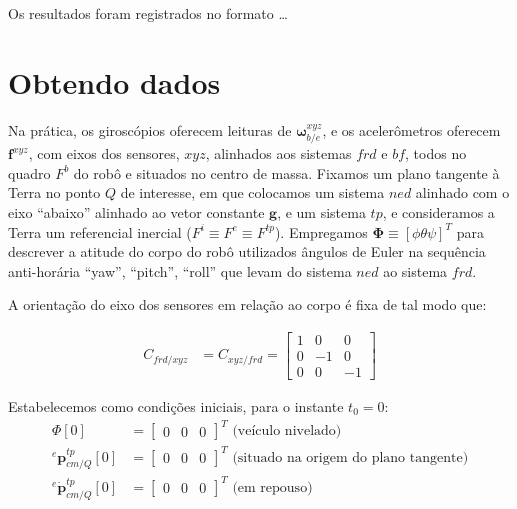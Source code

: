 Os resultados foram registrados no formato \ldots

\section{Obtendo dados}

Na prática, os giroscópios  oferecem leituras de \(\mathbf{\omega}^{xyz}_{b/e}\), e os acelerômetros oferecem \(\mathbf{f}^{xyz}\), com eixos dos sensores, \(xyz\), alinhados aos sistemas \(frd\) e \(bf\), todos no quadro \(F^{b}\) do robô e situados no centro de massa. Fixamos um plano tangente à Terra no ponto \(Q\) de interesse, em que colocamos um sistema \(ned\) alinhado com o eixo ``abaixo'' alinhado ao vetor constante \(\mathbf{g}\), e um sistema \(tp\), e consideramos a Terra um referencial inercial (\(F^{i} \equiv F^{e}\equiv F^{tp}\)). Empregamos \(\mathbf{\Phi} \equiv \left[\phi \theta \psi \right]^T \) para descrever a atitude do corpo do robô utilizados ângulos de Euler na sequência anti-horária ``yaw'', ``pitch'', ``roll'' que levam do sistema \(ned\) ao sistema \(frd\).

A orientação do eixo dos sensores em relação ao corpo é fixa de tal modo que:

\begin{align*}
    {{C}_{frd/xyz}} &= {{C}_{xyz/frd}}  = \begin{bmatrix} 1 & 0 & 0 \\ 0 & -1 & 0 \\ 0 & 0 & -1 \end{bmatrix}
\end{align*}


Estabelecemos como condições iniciais, para o instante \(t_{0} = 0\):
\begin{align*}
    {\Phi} \left[0\right] 
        &= \begin{bmatrix} 0 & 0 & 0 \end{bmatrix}^{T} \text{ (veículo nivelado)} \\
    {^{e}{\mathbf{p}^{tp}_{cm/Q}}\left[0\right]}
    &= \begin{bmatrix} 0 & 0 & 0 \end{bmatrix}^{T} \text{ (situado na origem do plano tangente)} \\
    {^{e}{\dot{\mathbf{p}}^{tp}_{cm/Q}}\left[0\right]}
    &= \begin{bmatrix} 0 & 0 & 0 \end{bmatrix}^{T} \text{ (em repouso)} \\
\end{align*}

